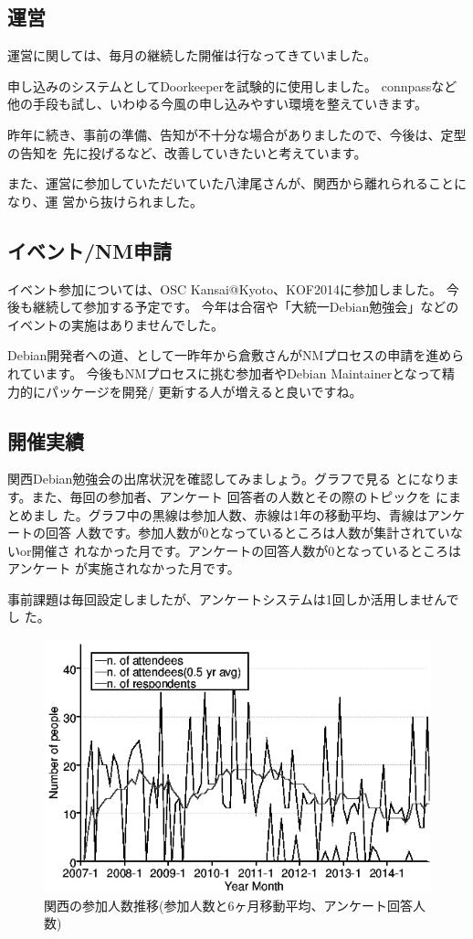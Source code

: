 \documentclass[mingoth,a4paper]{jsarticle}
\begin{document}
\subsection{運営}

運営に関しては、毎月の継続した開催は行なってきていました。

申し込みのシステムとしてDoorkeeperを試験的に使用しました。
connpassなど他の手段も試し、いわゆる今風の申し込みやすい環境を整えていきます。

昨年に続き、事前の準備、告知が不十分な場合がありましたので、今後は、定型の告知を
先に投げるなど、改善していきたいと考えています。

また、運営に参加していただいていた八津尾さんが、関西から離れられることになり、運
営から抜けられました。

\subsection{イベント/NM申請}

イベント参加については、OSC Kansai@Kyoto、KOF2014に参加しました。
今後も継続して参加する予定です。
%
今年は合宿や「大統一Debian勉強会」などのイベントの実施はありませんでした。

Debian開発者への道、として一昨年から倉敷さんがNMプロセスの申請を進められています。
今後もNMプロセスに挑む参加者やDebian Maintainerとなって精力的にパッケージを開発/
更新する人が増えると良いですね。

\subsection{開催実績}
関西Debian勉強会の出席状況を確認してみましょう。グラフで見る
とになります。また、毎回の参加者、アンケート
回答者の人数とその際のトピックを  にまとめまし
た。グラフ中の黒線は参加人数、赤線は1年の移動平均、青線はアンケートの回答
人数です。参加人数が$0$となっているところは人数が集計されていないor開催さ
れなかった月です。アンケートの回答人数が$0$となっているところはアンケート
が実施されなかった月です。

事前課題は毎回設定しましたが、アンケートシステムは1回しか活用しませんでし
た。

%
\begin{figure}[h]
  \begin{center}
    \includegraphics[width=.6\hsize]{image201412/memberanalysis/kansai_mono.png}
  \end{center}
  \caption{関西の参加人数推移(参加人数と6ヶ月移動平均、アンケート回答人数)}
  \label{fig:kansaipeoplechart}
\end{figure}
\end{document}
